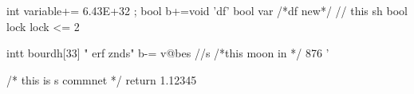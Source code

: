 int variable+= 6.43E+32 ;
bool b+=void 'df' 
bool var  /*df new*/    // this sh  
bool lock   lock <= 2
   
intt bourdh[33]  " erf znds" b-= v@bes //s
/*this moon in */  876  '%

/*  this is s commnet  */
return 1.12345